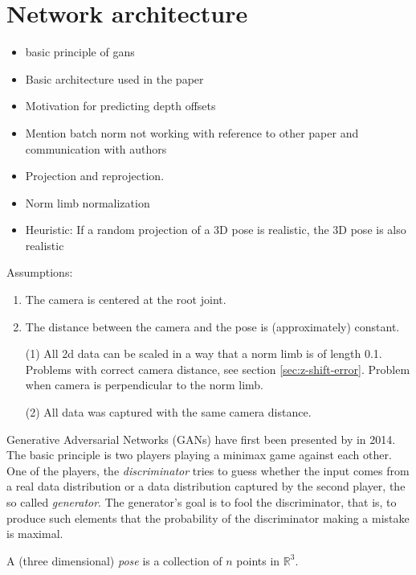 \section{Network architecture}\label{sec:network}
\begin{itemize}
	\item basic principle of gans
	\item Basic architecture used in the paper
	\item Motivation for predicting depth offsets
	\item Mention batch norm not working with reference to other paper and communication with authors
	\item Projection and reprojection.
	\item Norm limb normalization
	\item Heuristic: If a random projection of a 3D pose is realistic, the 3D pose is also realistic
\end{itemize}

Assumptions:
\begin{enumerate}[label=(\Alph*)]
	\item The camera is centered at the root joint.
	\item The distance between the camera and the pose is (approximately) constant. 
\end{enumerate}
\begin{itemize}
	\item[(1)] All 2d data can be scaled in a way that a norm limb is of length 0.1. 
	Problems with correct camera distance, see section \ref{sec:z-shift-error}. 
	Problem when camera is perpendicular to the norm limb.
	\item[(2)] All data was captured with the same camera distance.
\end{itemize}

Generative Adversarial Networks (GANs) have first been presented by \citet{goodfellow14} in 2014.
The basic principle is two players playing a minimax game against each other.
One of the players, the \textit{discriminator} tries to guess whether the input comes from a real data distribution or a data distribution captured by the second player, the so called \textit{generator}. 
The generator's goal is to fool the discriminator, that is, to produce such elements that the probability of the discriminator making a mistake is maximal.



A (three dimensional) \textit{pose} is a collection of $n$ points in $\mathbb{R}^3$.

